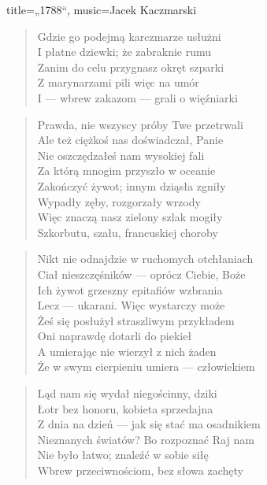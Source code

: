 \begin{song}{title={„1788“}, music={Jacek Kaczmarski}}
\begin{multicols}{2}
\begin{verse}
        Gdzie go podejmą karczmarze usłużni \\ 
        I płatne dziewki; że zabraknie rumu \\
        Zanim do celu przygnasz okręt szparki \\
        Z marynarzami pili więc na umór \\
        I --- wbrew zakazom --- grali o więźniarki
    \end{verse}
    \vfill\null\columnbreak{}
    \begin{verse}
        Prawda, nie wszyscy próby Twe przetrwali \\
        Ale też ciężkoś nas doświadczał, Panie \\
        Nie oszczędzałeś nam wysokiej fali \\ 
        Za którą mnogim przyszło w oceanie \\
        Zakończyć żywot; innym dziąsła zgniły \\
        Wypadły zęby, rozgorzały wrzody \\ 
        Więc znaczą nasz zielony szlak mogiły \\
        Szkorbutu, szału, francuskiej choroby
    \end{verse}
    \begin{verse}
        Nikt nie odnajdzie w ruchomych otchłaniach \\
        Ciał nieszczęśników --- oprócz Ciebie, Boże \\
        Ich żywot grzeszny epitafiów wzbrania \\
        Lecz --- ukarani. Więc wystarczy może \\ 
        Żeś się posłużył straszliwym przykładem \\
        Oni naprawdę dotarli do piekieł \\
        A umierając nie wierzył z nich żaden \\
        Że w swym cierpieniu umiera --- człowiekiem
    \end{verse}
    \begin{verse}
        Ląd nam się wydał niegościnny, dziki \\
        Łotr bez honoru, kobieta sprzedajna \\
        Z dnia na dzień --- jak się stać ma osadnikiem \\
        Nieznanych światów? Bo rozpoznać Raj nam \\
        Nie było łatwo; znaleźć w sobie siłę \\
        Wbrew przeciwnościom, bez słowa zachęty \\

\end{verse}
\end{multicols}
\end{song}
